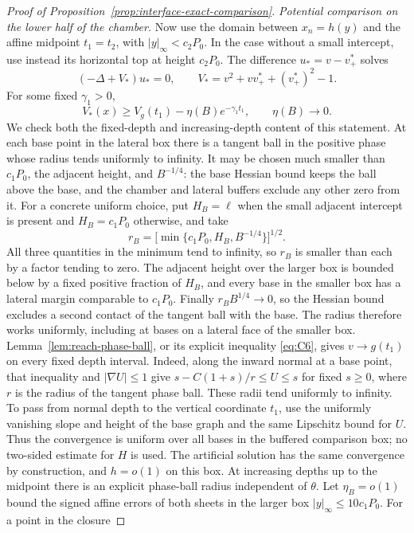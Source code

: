 \begin{proof}[Proof of Proposition~\ref{prop:interface-exact-comparison}]
\emph{Potential comparison on the lower half of the chamber.}
Now use the domain between $x_n=h(y)$ and the affine midpoint
$t_1=t_2$, with $|y|_\infty<c_2P_0$.  In the case without a small
intercept, use instead its horizontal top at height $c_2P_0$.
The difference $u_*=v-v^*_+$ solves
\[
 (-\Delta+V_*)u_*=0,
 \qquad V_*=v^2+vv^*_++(v^*_+)^2-1.
\]
For some fixed $\gamma_1>0$,
\begin{equation}\label{eq:interface-potential-comparison}
 V_*(x)\ge V_g(t_1)-\eta(B)e^{-\gamma_1t_1},\qquad
 \eta(B)\longrightarrow0.
\end{equation}
We check both the fixed-depth and increasing-depth content of this
statement.  At each base point in the lateral box there is a tangent
ball in the positive phase whose radius tends uniformly to infinity.
It may be chosen much smaller than $c_1P_0$, the adjacent height,
and $B^{-1/4}$: the base Hessian bound keeps the ball above the base,
and the chamber and lateral buffers exclude any other zero from it.
For a concrete uniform choice, put $H_B=\ell$ when the small adjacent
intercept is present and $H_B=c_1P_0$ otherwise, and take
\[
 r_B=\bigl[\min\{c_1P_0,H_B,B^{-1/4}\}\bigr]^{1/2}.
\]
All three quantities in the minimum tend to infinity, so $r_B$ is
smaller than each by a factor tending to zero.  The adjacent height
over the larger box is bounded below by a fixed positive fraction of
$H_B$, and every base in the smaller box has a lateral margin
comparable to $c_1P_0$.  Finally $r_B B^{1/4}\to0$, so the Hessian
bound excludes a second contact of the tangent ball with the base.
The radius therefore works uniformly, including at bases on a lateral
face of the smaller box.
Lemma~\ref{lem:reach-phase-ball}, or its explicit inequality
\eqref{eq:C6}, gives $v\to g(t_1)$ on every fixed depth interval.
Indeed, along the inward normal at a base point, that inequality and
$|\nabla U|\le1$ give
$s-C(1+s)/r\le U\le s$ for fixed $s\ge0$, where $r$ is the radius
of the tangent phase ball.  These radii tend uniformly to infinity.
To pass from normal depth to the vertical coordinate $t_1$, use the
uniformly vanishing slope and height of the base graph and the same
Lipschitz bound for $U$.  Thus the convergence is uniform over all bases
in the buffered comparison box; no two-sided estimate for $H$ is used.
The artificial solution has the same convergence by construction,
and $h=o(1)$ on this box.  At increasing depths up to the midpoint
there is an explicit phase-ball radius independent of $\theta$.
Let $\eta_B=o(1)$ bound the signed affine errors of both sheets in
the larger box $|y|_\infty\le10c_1P_0$.  For a point in the closure

\end{proof}
